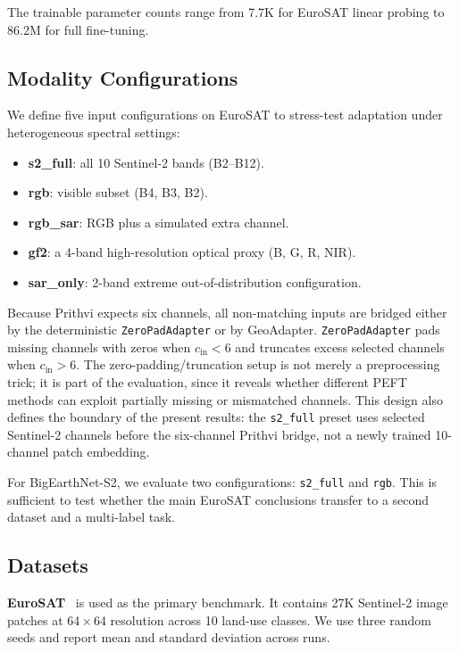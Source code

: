 The trainable parameter counts range from 7.7K for EuroSAT linear probing to 86.2M for full fine-tuning.

\subsection{Modality Configurations}
We define five input configurations on EuroSAT to stress-test adaptation under heterogeneous spectral settings:
\begin{itemize}[leftmargin=1.5em]
    \item \textbf{s2\_full}: all 10 Sentinel-2 bands (B2--B12).
    \item \textbf{rgb}: visible subset (B4, B3, B2).
    \item \textbf{rgb\_sar}: RGB plus a simulated extra channel.
    \item \textbf{gf2}: a 4-band high-resolution optical proxy (B, G, R, NIR).
    \item \textbf{sar\_only}: 2-band extreme out-of-distribution configuration.
\end{itemize}

Because Prithvi expects six channels, all non-matching inputs are bridged either by the deterministic \texttt{ZeroPadAdapter} or by GeoAdapter. \texttt{ZeroPadAdapter} pads missing channels with zeros when $c_{\mathrm{in}}<6$ and truncates excess selected channels when $c_{\mathrm{in}}>6$. The zero-padding/truncation setup is not merely a preprocessing trick; it is part of the evaluation, since it reveals whether different PEFT methods can exploit partially missing or mismatched channels. This design also defines the boundary of the present results: the \texttt{s2\_full} preset uses selected Sentinel-2 channels before the six-channel Prithvi bridge, not a newly trained 10-channel patch embedding.

For BigEarthNet-S2, we evaluate two configurations: \texttt{s2\_full} and \texttt{rgb}. This is sufficient to test whether the main EuroSAT conclusions transfer to a second dataset and a multi-label task.

\subsection{Datasets}
\textbf{EuroSAT}~\cite{helber2019eurosat} is used as the primary benchmark. It contains 27K Sentinel-2 image patches at 64\,$\times$\,64 resolution across 10 land-use classes. We use three random seeds and report mean and standard deviation across runs.


